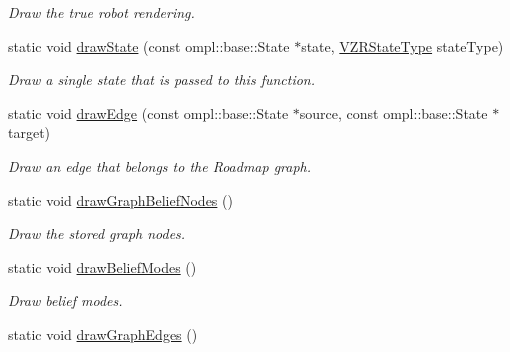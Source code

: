 \begin{DoxyCompactItemize}
\begin{DoxyCompactList}\small\item\em Draw the true robot rendering. \end{DoxyCompactList}\item 
\hypertarget{class_visualizer_ac4282cfa39ebe59311fee512d46cb9f7}{static void \hyperlink{class_visualizer_ac4282cfa39ebe59311fee512d46cb9f7}{draw\-State} (const ompl\-::base\-::\-State $\ast$state, \hyperlink{class_visualizer_a2710d7bdd6700c034876a3c43c328cd7}{V\-Z\-R\-State\-Type} state\-Type)}\label{class_visualizer_ac4282cfa39ebe59311fee512d46cb9f7}

\begin{DoxyCompactList}\small\item\em Draw a single state that is passed to this function. \end{DoxyCompactList}\item 
\hypertarget{class_visualizer_aca4b5a57dbd7d491b3889bd07cc04afa}{static void \hyperlink{class_visualizer_aca4b5a57dbd7d491b3889bd07cc04afa}{draw\-Edge} (const ompl\-::base\-::\-State $\ast$source, const ompl\-::base\-::\-State $\ast$target)}\label{class_visualizer_aca4b5a57dbd7d491b3889bd07cc04afa}

\begin{DoxyCompactList}\small\item\em Draw an edge that belongs to the Roadmap graph. \end{DoxyCompactList}\item 
\hypertarget{class_visualizer_a93168dcaa16bcb97a647d03183459778}{static void \hyperlink{class_visualizer_a93168dcaa16bcb97a647d03183459778}{draw\-Graph\-Belief\-Nodes} ()}\label{class_visualizer_a93168dcaa16bcb97a647d03183459778}

\begin{DoxyCompactList}\small\item\em Draw the stored graph nodes. \end{DoxyCompactList}\item 
\hypertarget{class_visualizer_a9755c745e5aeb4dc76b007594f95fd09}{static void \hyperlink{class_visualizer_a9755c745e5aeb4dc76b007594f95fd09}{draw\-Belief\-Modes} ()}\label{class_visualizer_a9755c745e5aeb4dc76b007594f95fd09}

\begin{DoxyCompactList}\small\item\em Draw belief modes. \end{DoxyCompactList}\item 
\hypertarget{class_visualizer_a12171ebc167f32a2a90c6e94d9505331}{static void \hyperlink{class_visualizer_a12171ebc167f32a2a90c6e94d9505331}{draw\-Graph\-Edges} ()}\label{class_visualizer_a12171ebc167f32a2a90c6e94d9505331}


\end{DoxyCompactItemize}
